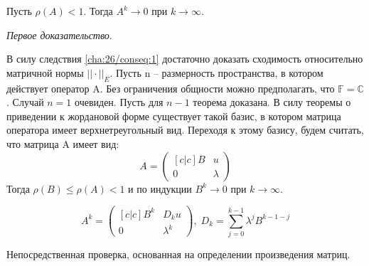\begin{theorem}[]\label{cha:27/the:2}
	Пусть $\rho(A) < 1$. Тогда $A^k \to 0$ при $k \to \infty$.
\end{theorem}
\begin{Proof}
	\textit{Первое доказательство}.

	В силу следствия \ref{cha:26/conseq:1} достаточно доказать сходимость относительно матричной нормы $||\cdot||_E$. Пусть n – размерность пространства, в котором действует оператор A. Без ограничения общности можно предполагать, что $\mathbb{F} = \mathbb{C}$. Случай $n = 1$ очевиден. Пусть для $n − 1$ теорема доказана. В силу теоремы о приведении к жордановой форме существует такой базис, в котором матрица оператора имеет верхнетреугольный вид. Переходя к этому базису, будем считать, что матрица A имеет вид:
	$$A = \begin{pmatrix}[c | c]
		B &  u \\ \hline
		0 &  \lambda
	\end{pmatrix}$$
	Тогда $\rho(B) \le \rho(A) < 1$ и по индукции $B^k \to 0$ при $k \to \infty$.

	\begin{lemma}\label{cha:27/lemma:1}
		$$A^k = \begin{pmatrix}[c | c]
		B^k &  D_k u \\ \hline
		0 &  \lambda^k
	\end{pmatrix}, \; D_k = \underset{j=0}{\overset{k-1}{\sum}}\lambda^j B^{k-1-j}$$
	\end{lemma}
	\begin{Proof}
		Непосредственная проверка, основанная на определении произведения матриц.
	\end{Proof}


\end{Proof}
